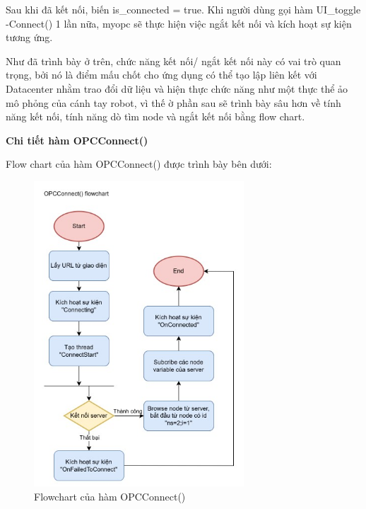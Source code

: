 Sau khi đã kết nối, biến is\_connected = true. Khi người dùng gọi hàm UI\_toggle -Connect()  1 lần nữa, myopc sẽ thực hiện việc ngắt kết nối và kích hoạt sự kiện tương ứng.

Như đã trình bày ở trên, chức năng kết nối/ ngắt kết nối này có vai trò quan trọng, bởi nó là điểm mấu chốt cho ứng dụng có thể tạo lập liên kết với Datacenter nhằm trao đổi dữ liệu và hiện thực chức năng như một thực thể ảo mô phỏng của cánh tay robot, vì thế ờ phần sau sẽ trình bày sâu hơn về tính năng kết nối, tính năng dò tìm node và ngắt kết nối bằng flow chart.

\textbf{Chi tiết hàm OPCConnect()}

Flow chart của hàm OPCConnect() được trình bày bên dưới:

\begin{figure}[H]
    \centering
    \includegraphics[width=0.7\textwidth]{Images/Implementation/VRapp/VR_connect_func.jpg}
    \caption{Flowchart của hàm OPCConnect()}
    \label{fig:flow_opcc}
\end{figure}

